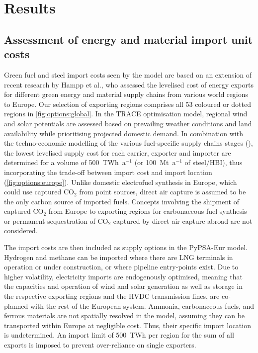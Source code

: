 
\section*{Results}

\subsection*{Assessment of energy and material import unit costs}



Green fuel and steel import costs seen by the model are based on an extension of
recent research by Hampp et al.,\cite{hamppImportOptions2023} who assessed the
levelised cost of energy exports for different green energy and material supply
chains from various world regions to Europe. Our selection of exporting regions
comprises all 53 coloured or dotted regions in \cref{fig:options:global}. In the
TRACE optimisation model,\cite{hamppImportOptions2023} regional wind and solar
potentials are assessed based on prevailing weather conditions and land
availability while prioritising projected domestic demand. In combination with
the techno-economic modelling of the various fuel-specific supply chains stages
(), the lowest levelised supply cost for each
carrier, exporter and importer are determined for a volume of 500~TWh~a$^{-1}$ (or
100~Mt~a$^{-1}$ of steel/HBI), thus incorporating the trade-off between import cost and
import location (\cref{fig:options:europe}). Unlike domestic electrofuel
synthesis in Europe, which could use captured CO$_2$ from point sources, direct
air capture is assumed to be the only carbon source of imported fuels. Concepts
involving the shipment of captured CO$_2$ from Europe to exporting regions for
carbonaceous fuel synthesis or permanent sequestration of CO$_2$ captured by
direct air capture abroad are not
considered.\cite{treeenergysolutionsGreenCycle2024,fonderSyntheticMethaneClosing2024}


The import costs are then included as supply options in the PyPSA-Eur model.
Hydrogen and methane can be imported where there are LNG terminals in operation
or under construction, or where pipeline entry-points exist. Due to higher
volatility, electricity imports are endogenously optimised, meaning that the
capacities and operation of wind and solar generation as well as storage in the
respective exporting regions and the HVDC transmission lines, are co-planned
with the rest of the  European system. Ammonia, carbonaceous fuels, and ferrous
materials are not spatially resolved in the model, assuming they can be
transported within Europe at negligible cost. Thus, their specific import
location is undetermined.  An import limit of 500~TWh per region for the sum of
all exports is imposed to prevent over-reliance on single exporters.

